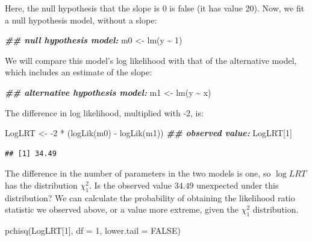 \documentclass[
  12pt,
]{krantz}
\newenvironment{Shaded}{\begin{snugshade}}{\end{snugshade}}
\newcommand{\AttributeTok}[1]{\textcolor[rgb]{0.77,0.63,0.00}{#1}}
\newcommand{\ConstantTok}[1]{\textcolor[rgb]{0.00,0.00,0.00}{#1}}
\newcommand{\DecValTok}[1]{\textcolor[rgb]{0.00,0.00,0.81}{#1}}
\newcommand{\DocumentationTok}[1]{\textcolor[rgb]{0.56,0.35,0.01}{\textbf{\textit{#1}}}}
\newcommand{\FunctionTok}[1]{\textcolor[rgb]{0.00,0.00,0.00}{#1}}
\newcommand{\NormalTok}[1]{#1}
\newcommand{\OtherTok}[1]{\textcolor[rgb]{0.56,0.35,0.01}{#1}}
\newcommand{\SpecialCharTok}[1]{\textcolor[rgb]{0.00,0.00,0.00}{#1}}
\theoremstyle{definition}
\theoremstyle{definition}
\theoremstyle{definition}
\theoremstyle{definition}
\theoremstyle{remark}
\begin{document}
Here, the null hypothesis that the slope is 0 is false (it has value 20). Now, we fit a null hypothesis model, without a slope:

\begin{Shaded}
\begin{Highlighting}[]
\DocumentationTok{\#\# null hypothesis model:}
\NormalTok{m0 }\OtherTok{\textless{}{-}} \FunctionTok{lm}\NormalTok{(y }\SpecialCharTok{\textasciitilde{}} \DecValTok{1}\NormalTok{)}
\end{Highlighting}
\end{Shaded}

We will compare this model's log likelihood with that of the alternative model, which includes an estimate of the slope:

\begin{Shaded}
\begin{Highlighting}[]
\DocumentationTok{\#\# alternative hypothesis model:}
\NormalTok{m1 }\OtherTok{\textless{}{-}} \FunctionTok{lm}\NormalTok{(y }\SpecialCharTok{\textasciitilde{}}\NormalTok{ x)}
\end{Highlighting}
\end{Shaded}

The difference in log likelihood, multiplied with -2, is:

\begin{Shaded}
\begin{Highlighting}[]
\NormalTok{LogLRT }\OtherTok{\textless{}{-}} \SpecialCharTok{{-}}\DecValTok{2} \SpecialCharTok{*}\NormalTok{ (}\FunctionTok{logLik}\NormalTok{(m0) }\SpecialCharTok{{-}} \FunctionTok{logLik}\NormalTok{(m1))}
\DocumentationTok{\#\# observed value:}
\NormalTok{LogLRT[}\DecValTok{1}\NormalTok{]}
\end{Highlighting}
\end{Shaded}

\begin{verbatim}
## [1] 34.49
\end{verbatim}

The difference in the number of parameters in the two models is one, so \(\log LRT\) has the distribution \(\chi_1^2\). Is the observed value \(34.49\) unexpected under this distribution? We can calculate the probability of obtaining the likelihood ratio statistic we observed above, or a value more extreme, given the \(\chi_1^2\) distribution.

\begin{Shaded}
\begin{Highlighting}[]
\FunctionTok{pchisq}\NormalTok{(LogLRT[}\DecValTok{1}\NormalTok{], }\AttributeTok{df =} \DecValTok{1}\NormalTok{, }\AttributeTok{lower.tail =} \ConstantTok{FALSE}\NormalTok{)}
\end{Highlighting}
\end{Shaded}
\end{document}
